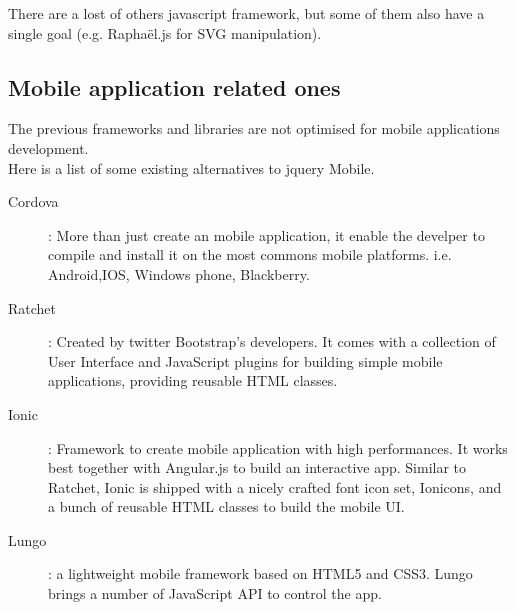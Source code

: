 \documentclass[12pt]{report}%
\begin{document}
There are a lost of others javascript framework, but some of them also have a single goal (e.g. Raphaël.js for SVG manipulation).


\subsection{Mobile application related ones}
The previous frameworks and libraries are not optimised for mobile applications development.\\
Here is a list of some existing alternatives to jquery Mobile.

\begin{description}
	\item[Cordova] : More than just create an mobile application, it enable the develper to compile and install it on the most commons mobile platforms. i.e. Android,IOS, Windows phone, Blackberry.
	\item[Ratchet] : Created by twitter Bootstrap's developers. It comes with a collection of User Interface and JavaScript plugins for building simple mobile applications, providing reusable HTML classes.
	\item[Ionic] : Framework to create mobile application with high performances. It works best together with Angular.js to build an interactive app. Similar to Ratchet, Ionic is shipped with a nicely crafted font icon set, Ionicons, and a bunch of reusable HTML classes to build the mobile UI.
	\item[Lungo] : a lightweight mobile framework based on HTML5 and CSS3. Lungo brings a number of JavaScript API to control the app.
\end{description}
\end{document}
